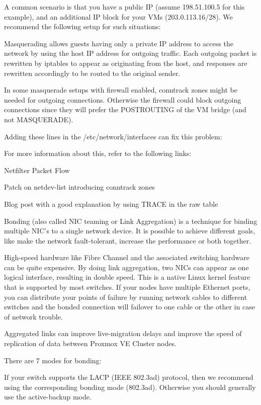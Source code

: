 A common scenario is that you have a public IP (assume 198.51.100.5 for this example), and an additional IP block for your VMs (203.0.113.16/28). We recommend the following setup for such situations:

Masquerading allows guests having only a private IP address to access the network by using the host IP address for outgoing traffic. Each outgoing packet is rewritten by iptables to appear as originating from the host, and responses are rewritten accordingly to be routed to the original sender.

In some masquerade setups with firewall enabled, conntrack zones might be needed for outgoing connections. Otherwise the firewall could block outgoing connections since they will prefer the POSTROUTING of the VM bridge (and not MASQUERADE).

Adding these lines in the /etc/network/interfaces can fix this problem:

For more information about this, refer to the following links:

Netfilter Packet Flow

Patch on netdev-list introducing conntrack zones

Blog post with a good explanation by using TRACE in the raw table

Bonding (also called NIC teaming or Link Aggregation) is a technique for binding multiple NIC’s to a single network device. It is possible to achieve different goals, like make the network fault-tolerant, increase the performance or both together.

High-speed hardware like Fibre Channel and the associated switching hardware can be quite expensive. By doing link aggregation, two NICs can appear as one logical interface, resulting in double speed. This is a native Linux kernel feature that is supported by most switches. If your nodes have multiple Ethernet ports, you can distribute your points of failure by running network cables to different switches and the bonded connection will failover to one cable or the other in case of network trouble.

Aggregated links can improve live-migration delays and improve the speed of replication of data between Proxmox VE Cluster nodes.

There are 7 modes for bonding:

If your switch supports the LACP (IEEE 802.3ad) protocol, then we recommend using the corresponding bonding mode (802.3ad). Otherwise you should generally use the active-backup mode.

